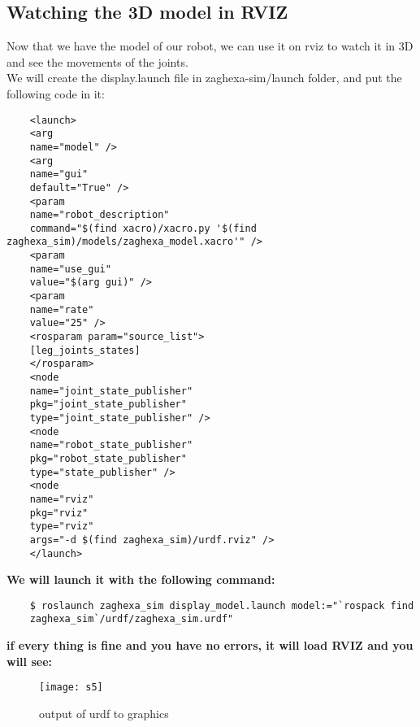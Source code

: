 	\subsection{Watching the 3D model in RVIZ}
	Now that we have the model of our robot, we can use it on rviz to watch it in 3D
	and see the movements of the joints.\\
	We will create the display.launch file in zaghexa-sim/launch folder,
	and put the following code in it:
	\begin{lstlisting}
	<launch>
	<arg
	name="model" />
	<arg
	name="gui"
	default="True" />
	<param
	name="robot_description"
	command="$(find xacro)/xacro.py '$(find zaghexa_sim)/models/zaghexa_model.xacro'" />
	<param
	name="use_gui"
	value="$(arg gui)" />
	<param
	name="rate"
	value="25" />
	<rosparam param="source_list">
	[leg_joints_states]
	</rosparam>
	<node
	name="joint_state_publisher"
	pkg="joint_state_publisher"
	type="joint_state_publisher" />
	<node
	name="robot_state_publisher"
	pkg="robot_state_publisher"
	type="state_publisher" />
	<node
	name="rviz"
	pkg="rviz"
	type="rviz"
	args="-d $(find zaghexa_sim)/urdf.rviz" />
	</launch>
	\end{lstlisting}	
	\textbf{We will launch it with the following command:}
	\begin{lstlisting}
	$ roslaunch zaghexa_sim display_model.launch model:="`rospack find
	zaghexa_sim`/urdf/zaghexa_sim.urdf"
	\end{lstlisting}
	\textbf{if every thing is fine and you have no errors, it will load RVIZ and you will see:}
	\begin{figure}[h]
		\centering
		\texttt{[image: s5]}
		\caption{output of urdf to graphics}
		\label{figure :s5}
	\end{figure}
